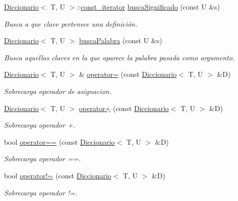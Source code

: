 \begin{DoxyCompactItemize}
\hyperlink{classDiccionario}{Diccionario}$<$ T, U $>$\+::\hyperlink{classDiccionario_1_1const__iterator}{const\+\_\+iterator} \hyperlink{classDiccionario_ab64193a99413ad5054992943560b3ead}{busca\+Significado} (const U \&s)
\begin{DoxyCompactList}\small\item\em Busca a que clave pertenece una definición. \end{DoxyCompactList}\item 
\hyperlink{classDiccionario}{Diccionario}$<$ T, U $>$ \hyperlink{classDiccionario_a293ea5b3aab95f544e2fae42664756fb}{busca\+Palabra} (const U \&s)
\begin{DoxyCompactList}\small\item\em Busca aquellas claves en la que aparece la palabra pasada como argumento. \end{DoxyCompactList}\item 
\hyperlink{classDiccionario}{Diccionario}$<$ T, U $>$ \& \hyperlink{classDiccionario_ad30f63b3857757296f1302273ee50a3d}{operator=} (const \hyperlink{classDiccionario}{Diccionario}$<$ T, U $>$ \&D)
\begin{DoxyCompactList}\small\item\em Sobrecarga operador de asignacion. \end{DoxyCompactList}\item 
\hyperlink{classDiccionario}{Diccionario}$<$ T, U $>$ \hyperlink{classDiccionario_a16db419cd9fac934b11496517e5bccae}{operator+} (const \hyperlink{classDiccionario}{Diccionario}$<$ T, U $>$ \&D)
\begin{DoxyCompactList}\small\item\em Sobrecarga operador +. \end{DoxyCompactList}\item 
bool \hyperlink{classDiccionario_a7470b316f0ea3f44b41079d8c625f65e}{operator==} (const \hyperlink{classDiccionario}{Diccionario}$<$ T, U $>$ \&D)
\begin{DoxyCompactList}\small\item\em Sobrecarga operador ==. \end{DoxyCompactList}\item 
bool \hyperlink{classDiccionario_ab08d7027cfbc561abb289e801849ee2e}{operator!=} (const \hyperlink{classDiccionario}{Diccionario}$<$ T, U $>$ \&D)
\begin{DoxyCompactList}\small\item\em Sobrecarga operador !=. \end{DoxyCompactList}\item 

\end{DoxyCompactItemize}
